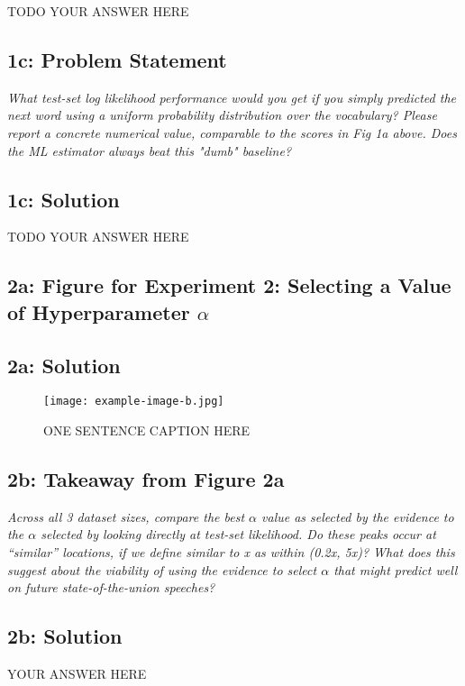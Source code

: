 \documentclass[12pt]{article}
\newcommand{\officialdirections}[1]{{\color{purple} #1}}
\begin{document}
TODO YOUR ANSWER HERE

\officialdirections{
\subsection*{1c: Problem Statement}
\emph{\large
What test-set log likelihood performance would you get if you simply predicted the next word using a uniform probability distribution over the vocabulary? Please report a concrete numerical value, comparable to the scores in Fig 1a above. Does the ML estimator always beat this "dumb" baseline?
}}

\subsection{1c: Solution}

TODO YOUR ANSWER HERE

\newpage 
\officialdirections{
\subsection*{2a: Figure for Experiment 2: Selecting a Value of Hyperparameter $\alpha$}
}

\subsection{2a: Solution}

\begin{figure}[!h]
     \centering
     \texttt{[image: example-image-b.jpg]} %
     \caption{ONE SENTENCE CAPTION HERE}
     \label{fig:fig1a}
\end{figure}

\officialdirections{
\subsection*{2b: Takeaway from Figure 2a}
\emph{\large 
Across all 3 dataset sizes, compare the best $\alpha$ value as selected by the evidence to the $\alpha$ selected by looking directly at test-set likelihood. Do these peaks occur at ``similar'' locations, if we define similar to x as within (0.2x, 5x)? What does this suggest about the viability of using the evidence to select $\alpha$ that might predict well on future state-of-the-union speeches?
}}

\subsection{2b: Solution}

YOUR ANSWER HERE
\end{document}
